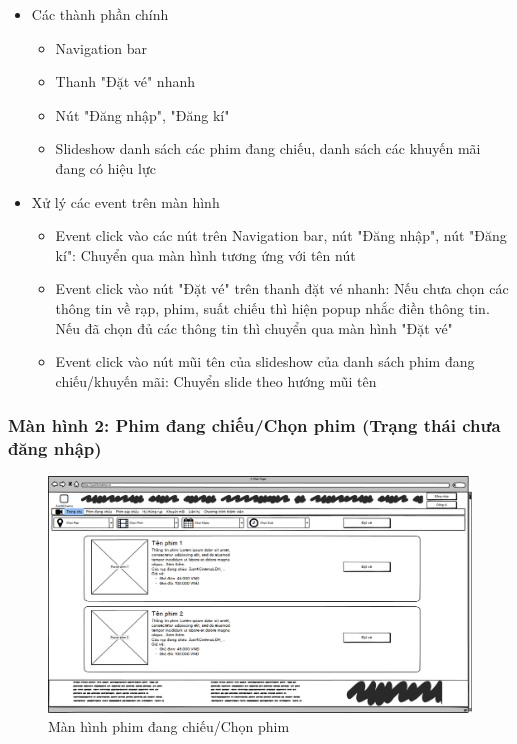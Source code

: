 \documentclass[a4paper, 12pt]{article}
\begin{document}
\begin{itemize}
	\item Các thành phần chính
	\begin{itemize}
		\item Navigation bar
		\item Thanh "Đặt vé" nhanh
		\item Nút "Đăng nhập", "Đăng kí"
		\item Slideshow danh sách các phim đang chiếu, danh sách các khuyến mãi đang có hiệu lực
	\end{itemize}

	\item Xử lý các event trên màn hình
	\begin{itemize}
		\item Event click vào các nút trên Navigation bar, nút "Đăng nhập", nút "Đăng kí": Chuyển qua màn hình tương ứng với tên nút
		\item Event click vào nút "Đặt vé" trên thanh đặt vé nhanh: Nếu chưa chọn các thông tin về rạp, phim, suất chiếu thì hiện popup nhắc điền thông tin. Nếu đã chọn đủ các thông tin thì chuyển qua màn hình "Đặt vé"
		\item Event click vào nút mũi tên của slideshow của danh sách phim đang chiếu/khuyến mãi: Chuyển slide theo hướng mũi tên
	\end{itemize}
\end{itemize}

\subsubsection{Màn hình 2: Phim đang chiếu/Chọn phim (Trạng thái chưa đăng nhập)}

\begin{figure}[H]
	\begin{center}
		\includegraphics[scale = 0.25]{Wireframe/User/Phim đang chiếu_ Chọn phim.png}
		\caption{Màn hình phim đang chiếu/Chọn phim}
	\end{center}
\end{figure}
\end{document}

